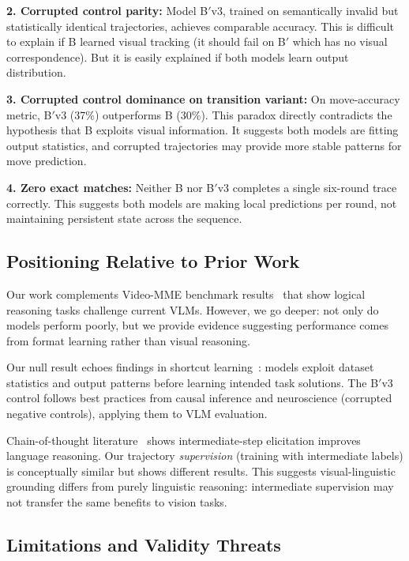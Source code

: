\textbf{2. Corrupted control parity:} Model B$'$v3, trained on semantically invalid but statistically identical trajectories, achieves comparable accuracy. This is difficult to explain if B learned visual tracking (it should fail on B$'$ which has no visual correspondence). But it is easily explained if both models learn output distribution.

\textbf{3. Corrupted control dominance on transition variant:} On move-accuracy metric, B$'$v3 (37\%) outperforms B (30\%). This paradox directly contradicts the hypothesis that B exploits visual information. It suggests both models are fitting output statistics, and corrupted trajectories may provide more stable patterns for move prediction.

\textbf{4. Zero exact matches:} Neither B nor B$'$v3 completes a single six-round trace correctly. This suggests both models are making local predictions per round, not maintaining persistent state across the sequence.

\subsection{Positioning Relative to Prior Work}

Our work complements Video-MME benchmark results~\cite{fu2024video} that show logical reasoning tasks challenge current VLMs. However, we go deeper: not only do models perform poorly, but we provide evidence suggesting performance comes from format learning rather than visual reasoning.

Our null result echoes findings in shortcut learning~\cite{geirhos2020shortcut}: models exploit dataset statistics and output patterns before learning intended task solutions. The B$'$v3 control follows best practices from causal inference and neuroscience (corrupted negative controls), applying them to VLM evaluation.

Chain-of-thought literature~\cite{wei2022chain} shows intermediate-step elicitation improves language reasoning. Our trajectory \emph{supervision} (training with intermediate labels) is conceptually similar but shows different results. This suggests visual-linguistic grounding differs from purely linguistic reasoning: intermediate supervision may not transfer the same benefits to vision tasks.

\subsection{Limitations and Validity Threats}

